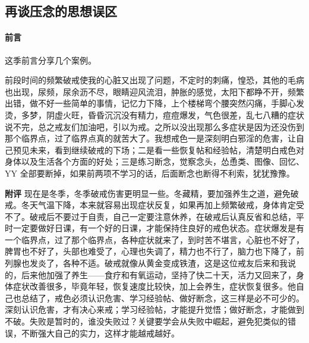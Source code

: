 \subsection{再谈压念的思想误区}

\paragraph*{前言}

这季前言分享几个案例。

\begin{case}
    前段时间的频繁破戒使我的心脏又出现了问题，不定时的刺痛，惶恐，其他的毛病也出现，尿频，尿余沥不尽，眼睛迎风流泪，肿胀的感觉，太阳下都睁不开，频繁出错，做不好一些简单的事情，记忆力下降，上个楼梯弯个腰突然闪痛，手脚心发烫，多梦，阴虚火旺，昏昏沉沉没有精力，痘痘爆发，气色很差，乱七八糟的症状说不完，总之戒友们加油吧，引以为戒。之所以没出现那么多症状是因为还没伤到那个临界点，过了临界点真的就苦大了。我想戒色一是深刻明白邪淫的危害，让自己预见未来，看到继续破戒的下场；二是看一些恢复帖和经验帖，清楚明白戒色对身体以及生活各个方面的好处；三是练习断念，觉察念头，怂恿类、图像、回忆、YY 全部要断掉，如果前两项不学习的话，后面断念也断得不利索，犹犹豫豫。

    \textbf{附评} 现在是冬季，冬季破戒伤害更明显一些。冬藏精，要加强养生之道，避免破戒。冬天气温下降，本来就容易出现症状反复，如果再加上频繁破戒，身体肯定受不了。破戒后不要过于自责，自己一定要注意休养，在破戒后认真反省和总结，平时一定要做好日课，有一个好的日课，才能保持住良好的戒色状态。症状爆发是有一个临界点，过了那个临界点，各种症状就来了，到时苦不堪言，心脏也不好了，脾胃也不好了，头部也难受了，心理也失调了，精力也不行了，脑力也下降了，前列腺也发炎了，各种不适。破戒就像从黄金变成铁渣，这是这位戒友后来和我说的，后来他加强了养生——食疗和有氧运动，坚持了快二十天，活力又回来了，身体症状改善很多，毕竟年轻，恢复速度比较快，加上会养生，症状恢复很多。他自己也总结了，戒色必须认识危害、学习经验帖、做好断念，这三样是必不可少的。深刻认识危害，才有决心来戒；学习经验帖，才能提升觉悟；做好断念，才能做到不破。失败是暂时的，谁没失败过？关键要学会从失败中崛起，避免犯类似的错误，不断强大自己的实力，这样才能越戒越好。
\end{case}

